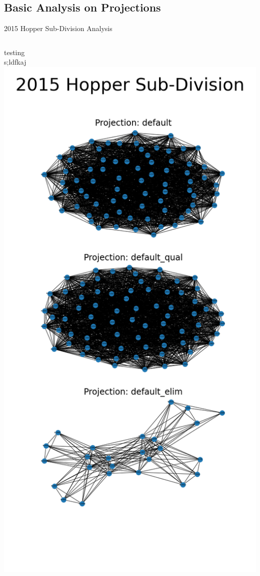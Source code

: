 \documentclass[10pt]{beamer}
\begin{document}
\subsection{Basic Analysis on Projections}
\begin{frame}{2015 Hopper Sub-Division Analysis}
	\begin{columns}
			testing\\
			s;ldfkaj
			\includegraphics[height=\textheight]{../fig/NetworkPlot_2015hop}
	\end{columns}
\end{frame}




%
%
%
\end{document}
